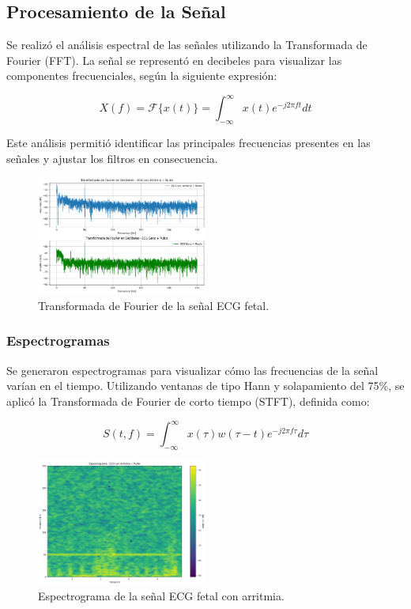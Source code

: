 \documentclass[10pt, conference]{IEEEtran}
\begin{document}
\subsection{Procesamiento de la Señal}

Se realizó el análisis espectral de las señales utilizando la Transformada de Fourier (FFT). La señal se representó en decibeles para visualizar las componentes frecuenciales, según la siguiente expresión:

\[
X(f) = \mathcal{F}\{x(t)\} = \int_{-\infty}^{\infty} x(t) e^{-j 2 \pi f t} dt
\]

Este análisis permitió identificar las principales frecuencias presentes en las señales y ajustar los filtros en consecuencia.

\begin{figure}[htbp]
\centerline{\includegraphics[width=0.5\textwidth]{ftt.png}}
\caption{Transformada de Fourier de la señal ECG fetal.}
\label{fig:fft_signal}
\end{figure}

\subsubsection{Espectrogramas}
Se generaron espectrogramas para visualizar cómo las frecuencias de la señal varían en el tiempo. Utilizando ventanas de tipo Hann y solapamiento del 75\%, se aplicó la Transformada de Fourier de corto tiempo (STFT), definida como:

\[
S(t, f) = \int_{-\infty}^{\infty} x(\tau) w(\tau - t) e^{-j 2 \pi f \tau} d\tau
\]

\begin{figure}[htbp]
	\centerline{\includegraphics[width=0.5\textwidth]{Espectrograma - ECG con Arritmia + Ruido.png}}
	\caption{Espectrograma de la señal ECG fetal con arritmia.}
	\label{fig:espectrograma_con_arritmia}
	\end{figure}
\end{document}
